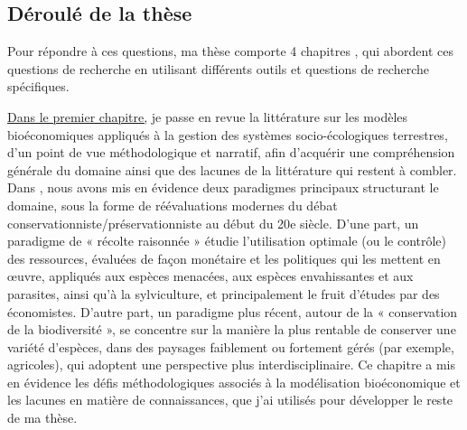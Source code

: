 {}
\subsection*{Déroulé de la thèse}


 
Pour répondre à ces questions, ma thèse comporte 4 chapitres , qui abordent ces questions de recherche en utilisant différents outils et questions de recherche spécifiques. 

\hyperref[chapter1]{Dans le premier chapitre,} je passe en revue la littérature sur les modèles bioéconomiques appliqués à la gestion des systèmes socio-écologiques terrestres, d'un point de vue méthodologique et narratif, afin d'acquérir une compréhension générale du domaine ainsi que des lacunes de la littérature qui restent à combler. Dans \citep{jean_bioeconomic_2022}, nous avons mis en évidence deux paradigmes principaux structurant le domaine, sous la forme de réévaluations modernes du débat conservationniste/préservationniste \citep{Banzhaf2019} au début du 20$\mathrm{e}$ siècle. D'une part, un paradigme de « récolte raisonnée » étudie l'utilisation optimale (ou le contrôle) des ressources, évaluées de façon monétaire et les politiques qui les mettent en œuvre, appliqués aux espèces menacées, aux espèces envahissantes et aux parasites, ainsi qu'à la sylviculture, et principalement le fruit d'études par des économistes. D'autre part, un paradigme plus récent, autour de la « conservation de la biodiversité », se concentre sur la manière la plus rentable de conserver une variété d'espèces, dans des paysages faiblement ou fortement gérés (par exemple, agricoles), qui adoptent une perspective plus interdisciplinaire. Ce chapitre a mis en évidence les défis méthodologiques associés à la modélisation bioéconomique et les lacunes en matière de connaissances, que j'ai utilisés pour développer le reste de ma thèse.
\\


\begin{table}[H]
\centering
{}
\caption{Distribution thématique des chapitres}
\end{table}

